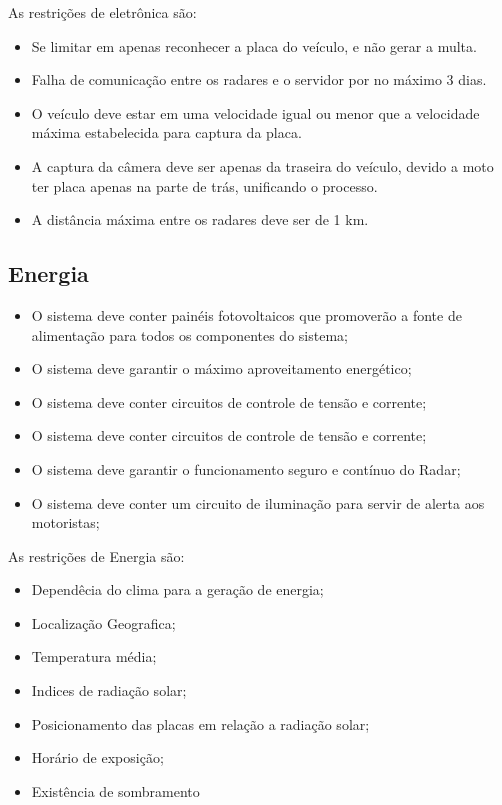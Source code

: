     As restrições de eletrônica são:

\begin{itemize}

	\item Se limitar em apenas reconhecer a placa do veículo, e não gerar a multa.
	\item Falha de comunicação entre os radares e o servidor por no máximo 3 dias.
	\item O veículo deve estar em uma velocidade igual ou menor que a velocidade máxima estabelecida para captura da placa.
	\item A captura da câmera deve ser apenas da traseira do veículo, devido a moto ter placa apenas na parte de trás, unificando o processo.
	\item A distância máxima entre os radares deve ser de 1 km.
	
\end{itemize} 	
	
\subsection{Energia}
\begin{itemize}
	\item O sistema deve conter painéis fotovoltaicos que promoverão a fonte de alimentação para todos os componentes do sistema;
	\item O sistema deve garantir o máximo aproveitamento energético;
	\item O sistema deve conter circuitos de controle de tensão e corrente;
	\item O sistema deve conter circuitos de controle de tensão e corrente;
	\item O sistema deve garantir o funcionamento seguro e contínuo do Radar;
	\item O sistema deve conter um circuito de iluminação para servir de alerta aos motoristas;

\end{itemize}

As restrições de Energia são:
\begin{itemize}
   \item Dependêcia do clima para a geração de energia;
   \item Localização Geografica;
   \item Temperatura média;
   \item Indices de radiação solar;
   \item Posicionamento das placas em relação a radiação solar;
   \item Horário de exposição;
   \item Existência de sombramento
 \end{itemize}
